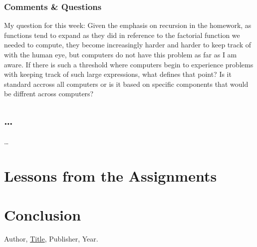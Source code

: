 \documentclass{article}
\theoremstyle{theorem}
\theoremstyle{definition}
\theoremstyle{remark}
\begin{document}
\subsubsection{Comments \& Questions}

My question for this week: Given the emphasis on recursion in the homework, as functions tend to expand as they did in reference to the factorial function we needed to compute, they become increasingly harder and harder to keep track of with the human eye, but computers do not have this problem as far as I am aware. If there is such a threshold where computers begin to experience problems with keeping track of such large expressions, what defines that point? Is it standard accross all computers or is it based on specific components that would be diffrent across computers?

\subsection{\ldots} 

\ldots

\section{Lessons from the Assignments}





\section{Conclusion}\label{conclusion}


\begin{thebibliography}{99}
 Author, \href{https://en.wikipedia.org/wiki/LaTeX}{Title}, Publisher, Year.
\end{thebibliography}
\end{document}
